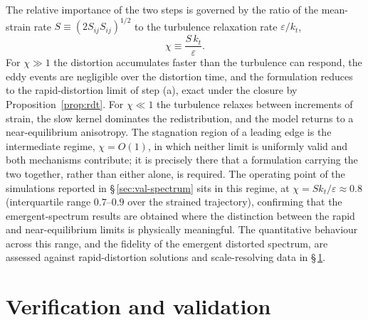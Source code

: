 \documentclass[lineno]{JFM-FLM_Au}
\begin{document}
The relative importance of the two steps is governed by the ratio of the
mean-strain rate $S\equiv(2S_{ij}S_{ij})^{1/2}$ to the turbulence
relaxation rate $\varepsilon/k_t$,
\begin{equation}
  \chi \equiv \frac{S\,k_t}{\varepsilon}.
  \label{eq:chi}
\end{equation}
For $\chi\gg1$ the distortion accumulates faster than the turbulence can
respond, the eddy events are negligible over the distortion time, and the
formulation reduces to the rapid-distortion limit of step (a), exact under
the closure by Proposition~\ref{prop:rdt}. For $\chi\ll1$ the turbulence
relaxes between increments of strain, the slow kernel dominates the
redistribution, and the model returns to a near-equilibrium anisotropy. The
stagnation region of a leading edge is the intermediate regime, $\chi=
O(1)$, in which neither limit is uniformly valid and both mechanisms
contribute; it is precisely there that a formulation carrying the two
together, rather than either alone, is required. The operating point of the
simulations reported in \S\,\ref{sec:val-spectrum} sits in this regime, at
$\chi=Sk_t/\varepsilon\approx0.8$ (interquartile range $0.7$--$0.9$ over the
strained trajectory), confirming that the emergent-spectrum results
are obtained where the distinction between the rapid and near-equilibrium limits
is physically meaningful. The quantitative behaviour
across this range, and the fidelity of the emergent distorted spectrum, are
assessed against rapid-distortion solutions and scale-resolving data in
\S\,\ref{sec:validation}.

%
%

\section{Verification and validation}\label{sec:validation}
\end{document}

